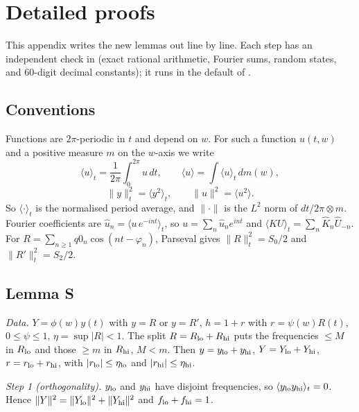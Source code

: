 \section{Detailed proofs}
\label{app:details}

This appendix writes the new lemmas out line by line.
Each step has an independent check in  (exact rational arithmetic, Fourier sums, random states, and $60$-digit decimal constants); it runs in the default of .

\subsection{Conventions}
\label{app:details:conv}
Functions are $2\pi$-periodic in $t$ and depend on $w$.
For such a function $u(t,w)$ and a positive measure $m$ on the $w$-axis we write
\begin{equation}
\langle u\rangle_t=\frac1{2\pi}\int_0^{2\pi}u\,dt,\qquad
\langle u\rangle=\int\langle u\rangle_t\,dm(w),
\end{equation}
\begin{equation}
\|y\|_t^2=\langle y^2\rangle_t,\qquad \|u\|^2=\langle u^2\rangle .
\end{equation}
So $\langle\cdot\rangle_t$ is the normalised period average, and $\|\cdot\|$ is the $L^2$ norm of $dt/2\pi\otimes m$.
Fourier coefficients are $\hat u_n=\langle u\,e^{-int}\rangle_t$, so $u=\sum_n\hat u_ne^{int}$ and $\langle KU\rangle_t=\sum_n\hat K_n\hat U_{-n}$.
For $R=\sum_{n\ge1}q0_n\cos(nt-\varphi_n)$, Parseval gives $\|R\|_t^2=S_0/2$ and $\|R'\|_t^2=S_2/2$.

\subsection{Lemma S}
\label{app:details:S}
\emph{Data.} $Y=\phi(w)y(t)$ with $y=R$ or $y=R'$, $h=1+r$ with $r=\psi(w)R(t)$, $0\le\psi\le1$, $\eta=\sup|R|<1$.
The split $R=R_{\rm lo}+R_{\rm hi}$ puts the frequencies $\le M$ in $R_{\rm lo}$ and those $\ge m$ in $R_{\rm hi}$, $M<m$.
Then $y=y_{\rm lo}+y_{\rm hi}$, $Y=Y_{\rm lo}+Y_{\rm hi}$, $r=r_{\rm lo}+r_{\rm hi}$, with $|r_{\rm lo}|\le\eta_{\rm lo}$ and $|r_{\rm hi}|\le\eta_{\rm hi}$.

\emph{Step 1 (orthogonality).} $y_{\rm lo}$ and $y_{\rm hi}$ have disjoint frequencies, so $\langle y_{\rm lo}y_{\rm hi}\rangle_t=0$.
Hence $\|Y\|^2=\|Y_{\rm lo}\|^2+\|Y_{\rm hi}\|^2$ and $f_{\rm lo}+f_{\rm hi}=1$.

